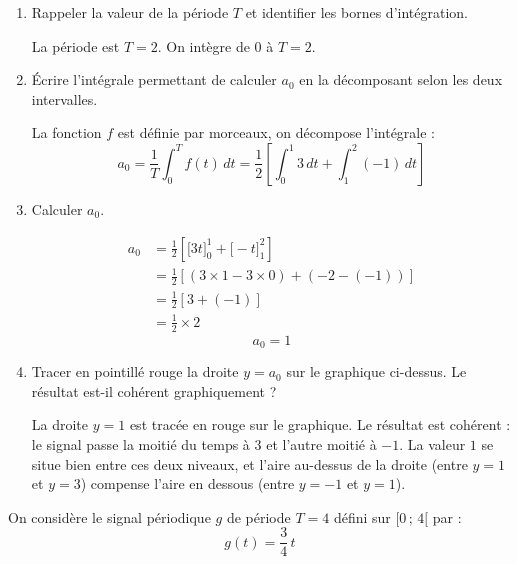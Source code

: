 \documentclass[a4paper,11pt]{article}
\begin{document}
\begin{enumerate}[label=\textbf{\alph*)}]
  \item Rappeler la valeur de la période $T$ et identifier les bornes d'intégration.
  \begin{tcolorbox}[corrigebox]
    La période est $T = 2$. On intègre de $0$ à $T = 2$.
  \end{tcolorbox}

  \item Écrire l'intégrale permettant de calculer $a_0$ en la décomposant selon les deux intervalles.
  \begin{tcolorbox}[corrigebox]
    La fonction $f$ est définie par morceaux, on décompose l'intégrale :
    \[
      a_0 = \frac{1}{T}\int_0^T f(t)\,dt = \frac{1}{2}\left[\int_0^1 3\,dt + \int_1^2 (-1)\,dt\right]
    \]
  \end{tcolorbox}

  \item Calculer $a_0$.
  \begin{tcolorbox}[corrigebox]
    \begin{align*}
      a_0 &= \frac{1}{2}\left[\Big[3t\Big]_0^1 + \Big[-t\Big]_1^2\right] \\
          &= \frac{1}{2}\left[(3\times 1 - 3\times 0) + (-2 - (-1))\right] \\
          &= \frac{1}{2}\left[3 + (-1)\right] \\
          &= \frac{1}{2}\times 2
    \end{align*}
    \[\boxed{a_0 = 1}\]
  \end{tcolorbox}

  \item Tracer en pointillé rouge la droite $y = a_0$ sur le graphique ci-dessus. Le résultat est-il cohérent graphiquement ?
  \begin{tcolorbox}[corrigebox]
    La droite $y = 1$ est tracée en rouge sur le graphique. Le résultat est cohérent : le signal passe la moitié du temps à $3$ et l'autre moitié à $-1$. La valeur $1$ se situe bien entre ces deux niveaux, et l'aire au-dessus de la droite (entre $y=1$ et $y=3$) compense l'aire en dessous (entre $y=-1$ et $y=1$).
  \end{tcolorbox}
\end{enumerate}

\vspace{0.3cm}

\begin{tcolorbox}[exobox={Exercice 2 -- Signal en dents de scie}]
  On considère le signal périodique $g$ de période $T = 4$ défini sur $[0\,;\,4[$ par :
  \[
    g(t) = \frac{3}{4}\,t
  \]
\end{tcolorbox}
\end{document}
